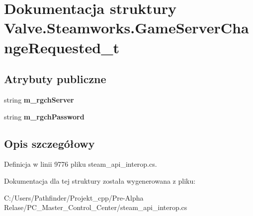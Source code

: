 \hypertarget{struct_valve_1_1_steamworks_1_1_game_server_change_requested__t}{}\section{Dokumentacja struktury Valve.\+Steamworks.\+Game\+Server\+Change\+Requested\+\_\+t}
\label{struct_valve_1_1_steamworks_1_1_game_server_change_requested__t}
\subsection*{Atrybuty publiczne}
\begin{DoxyCompactItemize}
\item 
\mbox{\label{struct_valve_1_1_steamworks_1_1_game_server_change_requested__t_a437b5195d7f2eaa964afc81aa298b639}} 
string {\bfseries m\+\_\+rgch\+Server}
\item 
\mbox{\label{struct_valve_1_1_steamworks_1_1_game_server_change_requested__t_a113a4b14b485efdb0fe44c62851457af}} 
string {\bfseries m\+\_\+rgch\+Password}
\end{DoxyCompactItemize}


\subsection{Opis szczegółowy}


Definicja w linii 9776 pliku steam\+\_\+api\+\_\+interop.\+cs.



Dokumentacja dla tej struktury została wygenerowana z pliku\+:\begin{DoxyCompactItemize}
\item 
C\+:/\+Users/\+Pathfinder/\+Projekt\+\_\+cpp/\+Pre-\/\+Alpha Relase/\+P\+C\+\_\+\+Master\+\_\+\+Control\+\_\+\+Center/steam\+\_\+api\+\_\+interop.\+cs\end{DoxyCompactItemize}
